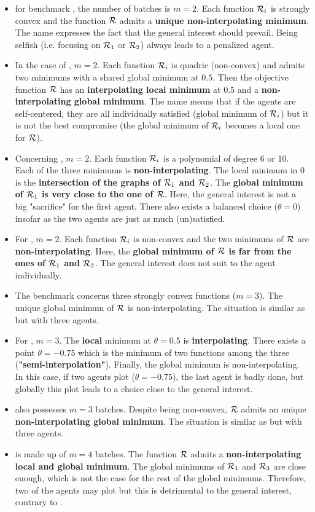 \documentclass[article,authoryear,jmlmc]{beg_32}             %
\begin{document}
\begin{itemize}
	\item for benchmark \exOne, the number of batches is $m=2$. Each function $\mathcal{R}_i$ is strongly convex and the function $\mathcal{R}$ admits a \textbf{unique non-interpolating minimum}. The name
          expresses the fact that the general interest should prevail. 
          Being selfish (i.e. focusing on $\mathcal{R}_1$ or $\mathcal{R}_2$)  always leads to a penalized agent.
	\item In the case of \exTwo, $m=2$. Each function $\mathcal{R}_i$ is quadric (non-convex) and admits two minimums with a shared global minimum at $0.5$. Then the objective function
          $\mathcal{R}$ has an \textbf{interpolating local minimum} at $0.5$ and a \textbf{non-interpolating global minimum}. The name means that if the agents are self-centered, they are all individually satisfied (global minimum of $\mathcal{R}_i$) but it is not the best compromise (the global minimum of $\mathcal{R}_i$ becomes a local one for $\mathcal{R}$).
	\item Concerning \exThree, $m=2$. Each function $\mathcal{R}_i$ is a polynomial of degree 6 or 10. Each of the three minimums is \textbf{non-interpolating}. The local minimum in 0
          is the \textbf{intersection of the graphs of $\mathcal{R}_1$ and $\mathcal{R}_2$}. The \textbf{global minimum of $\mathcal{R}_1$ is very close to the one of $\mathcal{R}$}. Here, the general interest is not a big "sacrifice" for the first agent. There also exists a balanced choice ($\theta=0$) insofar as the two agents are just as much (un)satisfied. 
	\item For \exFour, $m=2$. Each function $\mathcal{R}_i$ is non-convex and the two minimums of $\mathcal{R}$ are \textbf{non-interpolating}. Here, the \textbf{global minimum of $\mathcal{R}$ is far from the ones of $\mathcal{R}_1$ and $\mathcal{R}_2$}. The general interest does not suit to the agent individually. 
	\item The benchmark \exFive concerns three strongly convex functions ($m=3$). The unique global minimum of $\mathcal{R}$ is non-interpolating. The situation is similar as \exOne but with three agents.
	\item For \exSix, $m=3$. The \textbf{local} minimum at $\theta=0.5$ is \textbf{interpolating}. There exists a point $\theta=-0.75$ which is the minimum of two functions among the three (\textbf{"semi-interpolation"}). Finally, the global minimum is non-interpolating. In this case, if two agents plot ($\theta=-0.75$), the last agent is badly done, but globally this plot leads to a choice close to the general interest. 
	\item \exSeven also possesses $m=3$ batches. Despite being non-convex, $\mathcal{R}$ admits an unique \textbf{non-interpolating global minimum}. The situation is similar as \exFour but with three agents.
	\item \exHeight is made up of $m=4$ batches. The function $\mathcal{R}$ admits a \textbf{non-interpolating local and global minimum}. The global minimums of $\mathcal{R}_1$ and $\mathcal{R}_3$ are close enough, which is not the case for the rest of the global minimums. Therefore, two of the agents may plot but this is detrimental to the general interest, contrary to \exSix.      
\end{itemize}
\end{document}

